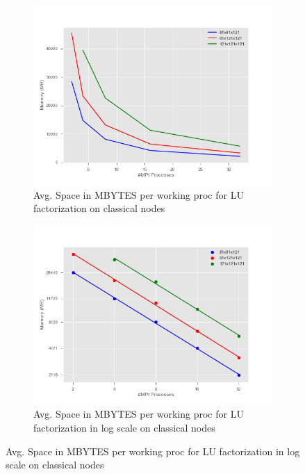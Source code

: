 \begin{figure}[!h]
\centering 
  \begin{subfigure}[b]{0.7\textwidth}
    \includegraphics[width=\textwidth]{images/memoryMPI.png}
    \caption{Avg. Space in MBYTES per working proc for LU factorization on classical nodes }
    \label{memoryMPI}
  \end{subfigure}
  \begin{subfigure}[b]{0.7\textwidth}
    \includegraphics[width=\textwidth]{images/MemoryMPIlog.png}
    \caption{Avg. Space in MBYTES per working proc for LU factorization in log scale on classical nodes}
    \label{MemoryMPIlog}
  \end{subfigure}
\end{figure} 

